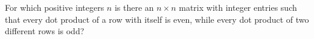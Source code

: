 For which positive integers $n$ is there an $n\times n$ matrix with integer entries such that every dot product of a row with itself is even, while every dot product of two different rows is odd?